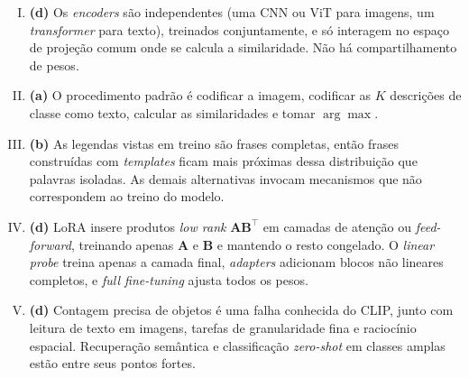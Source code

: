 \documentclass{dlproblemset}
\begin{document}
\begin{enumerate}[I)]
    \item \textbf{(d)} Os \textit{encoders} são independentes (uma CNN ou ViT para imagens, um \textit{transformer} para texto), treinados conjuntamente, e só interagem no espaço de projeção comum onde se calcula a similaridade. Não há compartilhamento de pesos.

    \item \textbf{(a)} O procedimento padrão é codificar a imagem, codificar as $K$ descrições de classe como texto, calcular as similaridades e tomar $\arg\max$.

    \item \textbf{(b)} As legendas vistas em treino são frases completas, então frases construídas com \textit{templates} ficam mais próximas dessa distribuição que palavras isoladas. As demais alternativas invocam mecanismos que não correspondem ao treino do modelo.

    \item \textbf{(d)} LoRA insere produtos \textit{low rank} $\mathbf{A}\mathbf{B}^{\top}$ em camadas de atenção ou \textit{feed-forward}, treinando apenas $\mathbf{A}$ e $\mathbf{B}$ e mantendo o resto congelado. O \textit{linear probe} treina apenas a camada final, \textit{adapters} adicionam blocos não lineares completos, e \textit{full fine-tuning} ajusta todos os pesos.

    \item \textbf{(d)} Contagem precisa de objetos é uma falha conhecida do CLIP, junto com leitura de texto em imagens, tarefas de granularidade fina e raciocínio espacial. Recuperação semântica e classificação \textit{zero-shot} em classes amplas estão entre seus pontos fortes.
\end{enumerate}
\end{document}

